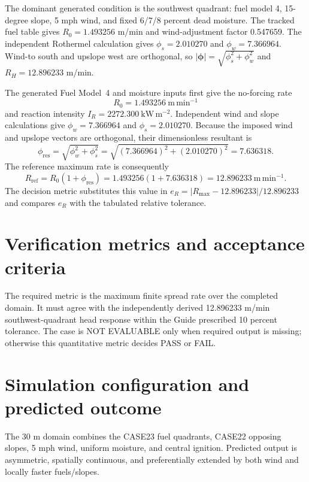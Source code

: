 The dominant generated condition is the southwest quadrant: fuel model 4, 15-degree slope, 5 mph wind, and fixed 6/7/8 percent dead moisture. The tracked fuel table gives \(R_0=1.493256\) m/min and wind-adjustment factor 0.547659. The independent Rothermel calculation gives \(\phi_s=2.010270\) and \(\phi_w=7.366964\). Wind-to south and upslope west are orthogonal, so \(|\boldsymbol{\phi}|=\sqrt{\phi_s^2+\phi_w^2}\) and \(R_H=12.896233\) m/min.

The generated Fuel Model~4 and moisture inputs first give the no-forcing
rate\[R_0=1.493256~\mathrm{m\,min^{-1}}\]and reaction intensity
\(I_R=2272.300~\mathrm{kW\,m^{-2}}\).  Independent wind and slope
calculations give \(\phi_w=7.366964\) and \(\phi_s=2.010270\).
Because the imposed wind and upslope vectors are orthogonal, their
dimensionless resultant is
\[
 \phi_{\mathrm{res}}=\sqrt{\phi_w^2+\phi_s^2}
 =\sqrt{(7.366964)^2+(2.010270)^2}=7.636318.
\]
The reference maximum rate is consequently
\[
 R_{\mathrm{ref}}=R_0(1+\phi_{\mathrm{res}})
 =1.493256(1+7.636318)=12.896233~\mathrm{m\,min^{-1}}.
\]
The decision metric substitutes this value in
\(e_R=|R_{\max}-12.896233|/12.896233\) and compares \(e_R\) with the
tabulated relative tolerance.

\section{Verification metrics and acceptance criteria}

The required metric is the maximum finite spread rate over the completed domain. It must agree with the independently derived 12.896233 m/min southwest-quadrant head response within the Guide prescribed 10 percent tolerance. The case is NOT EVALUABLE only when required output is missing; otherwise this quantitative metric decides PASS or FAIL.

\section{Simulation configuration and predicted outcome}

The 30 m domain combines the CASE23 fuel quadrants, CASE22 opposing slopes, 5 mph wind, uniform moisture, and central ignition. Predicted output is asymmetric, spatially continuous, and preferentially extended by both wind and locally faster fuels/slopes.

